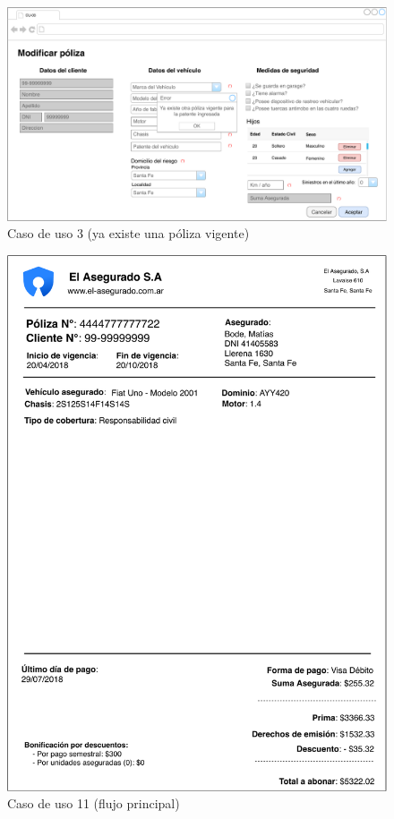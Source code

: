 \documentclass[12pt]{article}
\begin{document}
\vfill
\begin{figure}[h!]
\includegraphics[width=\textwidth]{CU3/CU-034.pdf}
\caption{Caso de uso 3 (ya existe una póliza vigente)}
\end{figure}
\vfill




\vfill
\begin{figure}[h!]
\includegraphics[width=\textwidth]{CU11/CU-111.pdf}
\caption{Caso de uso 11 (flujo principal)}
\end{figure}
\vfill
\end{document}
